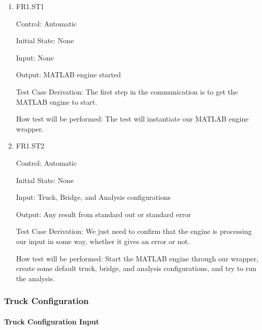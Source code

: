 \documentclass[12pt, titlepage]{article}
\begin{document}
\begin{enumerate}

  \item{FR1.ST1\\}

  Control: Automatic

  Initial State: None

  Input: None

  Output: MATLAB engine started

  Test Case Derivation: The first step in the communication is to get the MATLAB engine
  to start.

  How test will be performed: The test will instantiate our MATLAB engine wrapper.

  \item{FR1.ST2\\}

  Control: Automatic

  Initial State: None

  Input: Truck, Bridge, and Analysis configurations

  Output: Any result from standard out or standard error

  Test Case Derivation: We just need to confirm that the engine is processing our
  input in some way, whether it gives an error or not.

  How test will be performed: Start the MATLAB engine through our wrapper, create
  some default truck, bridge, and analysis configurations, and try to run the analysis.

\end{enumerate}

\subsubsection{Truck Configuration}

\paragraph{Truck Configuration Input}
\end{document}
